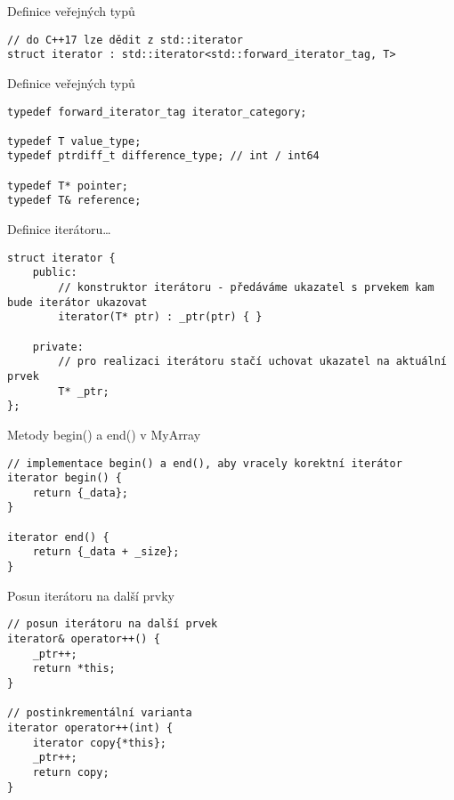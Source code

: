 \begin{frame}[fragile]
\begin{deprecatedblock}{{\WARNING} Definice veřejných typů}
\begin{lstlisting}
// do C++17 lze dědit z std::iterator
struct iterator : std::iterator<std::forward_iterator_tag, T>
\end{lstlisting}
\end{deprecatedblock}	


\begin{exampleblock}{{\YES} Definice veřejných typů}
\begin{lstlisting}
typedef forward_iterator_tag iterator_category;

typedef T value_type;
typedef ptrdiff_t difference_type; // int / int64

typedef T* pointer;
typedef T& reference;
\end{lstlisting}
\end{exampleblock}	
\end{frame}

\begin{frame}[fragile]
\begin{exampleblock}{{\YES} Definice iterátoru\ldots}
\begin{lstlisting}
struct iterator {
	public:
		// konstruktor iterátoru - předáváme ukazatel s prvekem kam bude iterátor ukazovat
		iterator(T* ptr) : _ptr(ptr) { } 

	private:
		// pro realizaci iterátoru stačí uchovat ukazatel na aktuální prvek
		T* _ptr;
};		
\end{lstlisting}
\end{exampleblock}	
\end{frame}


\begin{frame}[fragile]
\begin{exampleblock}{{\YES} Metody begin() a end() v MyArray}
\begin{lstlisting}
// implementace begin() a end(), aby vracely korektní iterátor
iterator begin() {
	return {_data};
}

iterator end() {
	return {_data + _size};
}
\end{lstlisting}
\end{exampleblock}	
\end{frame}


\begin{frame}[fragile]
\begin{exampleblock}{{\YES} Posun iterátoru na další prvky}
\begin{lstlisting}
// posun iterátoru na další prvek
iterator& operator++() {
	_ptr++;
	return *this;
}

// postinkrementální varianta
iterator operator++(int) {
	iterator copy{*this};
	_ptr++;
	return copy;
}
\end{lstlisting}
\end{exampleblock}	
\end{frame}


